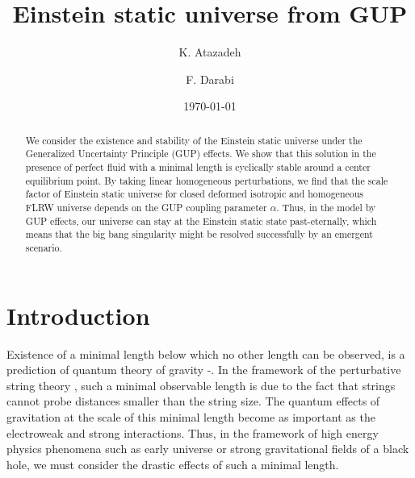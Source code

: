 \documentclass[showpacs,amsmath,nofootinbib,amssymb,epsfig]{revtex4}
\begin{document}
\title{Einstein static universe from GUP }
\author{K. Atazadeh }
\author{F. Darabi}

\date{\today}
\begin{abstract}
We consider the existence and stability of the Einstein static universe under the Generalized Uncertainty Principle (GUP) effects.
We show that this solution in the presence of perfect fluid with a minimal length is cyclically stable
around a center equilibrium point. By taking linear homogeneous perturbations, we find that the scale factor of Einstein static universe for closed deformed isotropic and homogeneous FLRW universe depends on the GUP coupling parameter $\alpha$. Thus, in the model by GUP effects, our universe can stay at the Einstein static state past-eternally, which means that the big bang singularity might be resolved successfully by an emergent scenario.

\end{abstract}

\maketitle

\section{Introduction}
Existence of a minimal length below which no other length can be
observed, is a prediction of quantum theory of gravity \cite{a}-\cite{f}. In the framework of the perturbative string theory {\cite{a,b}}, such a minimal observable length is due to the fact that strings cannot probe distances smaller than the
string size. The quantum effects of gravitation at the scale of this minimal length become as important as the electroweak and strong
interactions. Thus, in the framework of high energy physics phenomena such as early universe or  strong gravitational
fields of a black hole, we must consider the drastic effects of such a minimal length.
\end{document}
